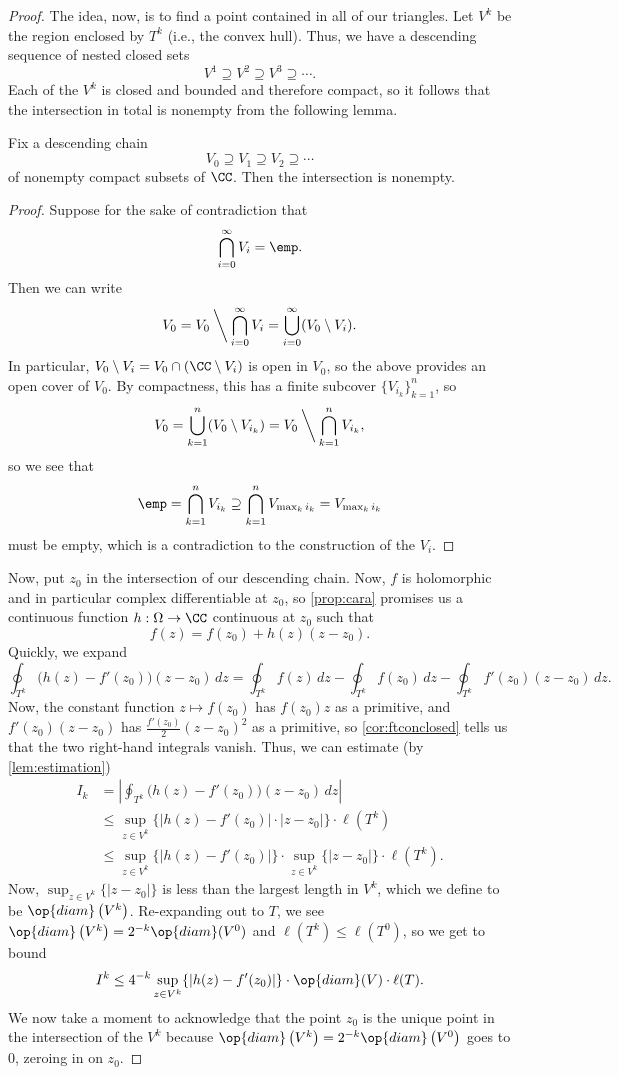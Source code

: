 \begin{proof}
	The idea, now, is to find a point contained in all of our triangles. Let $V^k$ be the region enclosed by $T^k$ (i.e., the convex hull). Thus, we have a descending sequence of nested closed sets
	\[V^1\supseteq V^2\supseteq V^3\supseteq\cdots.\]
	Each of the $V^k$ is closed and bounded and therefore compact, so it follows that the intersection in total is nonempty from the following lemma.
	\begin{lemma}
		Fix a descending chain
		\[V_0\supseteq V_1\supseteq V_2\supseteq\cdots\]
		of nonempty compact subsets of $\CC$. Then the intersection is nonempty.
	\end{lemma}
	\begin{proof}
		Suppose for the sake of contradiction that
		\[\bigcap_{i=0}^\infty V_i=\emp.\]
		Then we can write
		\[V_0=V_0\mathbin{\bigg\backslash}\bigcap_{i=0}^\infty V_i=\bigcup_{i=0}^\infty(V_0\setminus V_i).\]
		In particular, $V_0\setminus V_i=V_0\cap(\CC\setminus V_i)$ is open in $V_0$, so the above provides an open cover of $V_0$. By compactness, this has a finite subcover $\{V_{i_k}\}_{k=1}^n$, so
		\[V_0=\bigcup_{k=1}^n(V_0\setminus V_{i_k})=V_0\mathbin{\bigg\backslash}\bigcap_{k=1}^nV_{i_k},\]
		so we see that
		\[\emp=\bigcap_{k=1}^nV_{i_k}\supseteq\bigcap_{k=1}^nV_{\max_ki_k}=V_{\max_ki_k}\]
		must be empty, which is a contradiction to the construction of the $V_i$.
	\end{proof}
	Now, put $z_0$ in the intersection of our descending chain. Now, $f$ is holomorphic and in particular complex differentiable at $z_0$, so \autoref{prop:cara} promises us a continuous function $h:\Omega\to\CC$ continuous at $z_0$ such that
	\[f(z)=f(z_0)+h(z)(z-z_0).\]
	Quickly, we expand
	\[\oint_{T^k}\big(h(z)-f'(z_0)\big)(z-z_0)\,dz=\oint_{T^k}f(z)\,dz-\oint_{T^k}f(z_0)\,dz-\oint_{T^k}f'(z_0)(z-z_0)\,dz.\]
	Now, the constant function $z\mapsto f(z_0)$ has $f(z_0)z$ as a primitive, and $f'(z_0)(z-z_0)$ has $\frac{f'(z_0)}2(z-z_0)^2$ as a primitive, so \autoref{cor:ftconclosed} tells us that the two right-hand integrals vanish. Thus, we can estimate (by \autoref{lem:estimation})
	\begin{align*}
		I_k &= \left|\oint_{T^k}\big(h(z)-f'(z_0)\big)(z-z_0)\,dz\right| \\
		&\le \sup_{z\in V^k}\{|h(z)-f'(z_0)|\cdot|z-z_0|\}\cdot\ell\left(T^k\right) \\
		&\le \sup_{z\in V^k}\{|h(z)-f'(z_0)|\} \cdot\sup_{z\in V^k}\{|z-z_0|\}\cdot\ell\left(T^k\right).
	\end{align*}
	Now, $\sup_{z\in V^k}\{|z-z_0|\}$ is less than the largest length in $V^k$, which we define to be $\op{diam}\left(V^k\right)$. Re-expanding out to $T$, we see $\op{diam}\left(V^k\right)=2^{-k}\op{diam}(V^0)$ and $\ell\left(T^k\right)\le\ell(T^0)$, so we get to bound
	\[I^k\le 4^{-k}\sup_{z\in V^k}\{|h(z)-f'(z_0)|\}\cdot\op{diam}(V)\cdot\ell(T).\]
	We now take a moment to acknowledge that the point $z_0$ is the unique point in the intersection of the $V^k$ because $\op{diam}\left(V^k\right)=2^{-k}\op{diam}\left(V^0\right)$ goes to $0$, zeroing in on $z_0$.


\end{proof}
